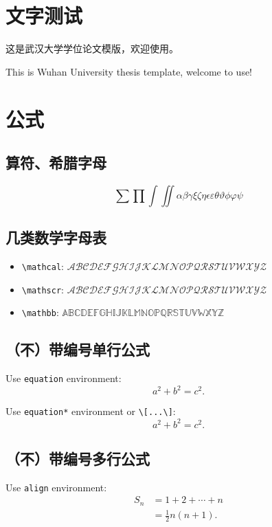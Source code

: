 \documentclass[class = professional, oneside]{gdufe_master_thesis}
\begin{document}
\section{文字测试}

这是武汉大学学位论文模版，欢迎使用。

This is Wuhan University thesis template, welcome to use!

\section{公式}

\subsection{算符、希腊字母}

\[\sum\prod\int\iint\alpha\beta\gamma\xi\zeta\eta\epsilon\varepsilon\theta\vartheta
    \phi\varphi\psi\]


\subsection{几类数学字母表}

\begin{itemize}
    \item \verb|\mathcal|: $\mathcal{ABCDEFGHIJKLMNOPQRSTUVWXYZ}$
    \item \verb|\mathscr|: $\mathscr{ABCDEFGHIJKLMNOPQRSTUVWXYZ}$
    \item \verb|\mathbb|: $\mathbb{ABCDEFGHIJKLMNOPQRSTUVWXYZ}$
\end{itemize}


\subsection{（不）带编号单行公式}

Use \texttt{equation} environment:
\begin{equation}
    a^2 + b^2 = c^2.
\end{equation}

Use \texttt{equation*} environment or \texttt{\textbackslash[...\textbackslash]}:
\[ a^2 + b^2 = c^2.\]

\subsection{（不）带编号多行公式}

Use \texttt{align} environment:
\begin{align}
    S_n & = 1 + 2 + \cdots + n \\
        & = \frac12 n(n+1).
\end{align}
\end{document}
